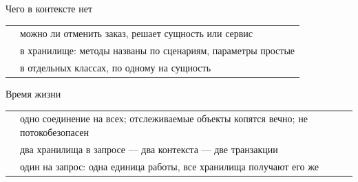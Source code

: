 \documentclass[aspectratio=169,10pt,t]{beamer}
\begin{document}
\begin{frame}{Чего в контексте нет}
  \slidetop

  {\renewcommand{\arraystretch}{1.6}
  \begin{tabular}{@{}L{4.0cm}L{8.8cm}@{}}
     & можно ли отменить заказ, решает сущность или
      сервис \\
          & в хранилище: методы названы по сценариям,
      параметры простые \\
      & в отдельных классах, по одному на сущность \\
  \end{tabular}}

  \slidegap
\end{frame}

\begin{frame}[plain]
\end{frame}

\begin{frame}{Время жизни}
  \slidetop
  {\renewcommand{\arraystretch}{1.6}
  \begin{tabular}{@{}L{3.2cm}L{9.6cm}@{}}
     & одно соединение на всех; отслеживаемые объекты
      копятся вечно; не потокобезопасен \\
     & два хранилища в запросе --- два контекста --- две
      транзакции \\
        & один на запрос: одна единица работы, все хранилища
      получают его же \\
  \end{tabular}}

  \slidegap
\end{frame}
\end{document}
